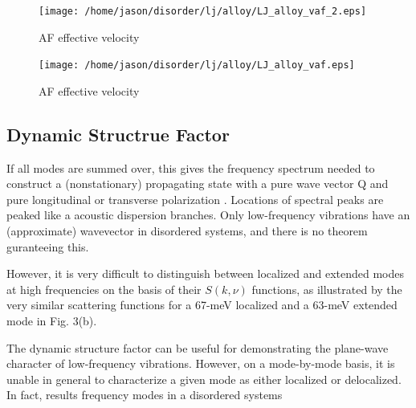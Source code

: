 \documentclass[aps,prb,preprint,superscriptaddress,amsmath,amssymb,floatfix]{revtex4}
\begin{document}
\begin{figure}
\begin{center}
\texttt{[image: /home/jason/disorder/lj/alloy/LJ\_alloy\_vaf\_2.eps]}
\vspace*{-5mm}
\end{center}
\caption{\label{FIG:phonon_diff} AF effective velocity}
\end{figure}

\begin{figure}
\begin{center}
\texttt{[image: /home/jason/disorder/lj/alloy/LJ\_alloy\_vaf.eps]}
\vspace*{-5mm}
\end{center}
\caption{\label{FIG:phonon_diff} AF effective velocity}
\end{figure}

\vspace*{100mm}

\subsection{\label{S:Lifetimes:}Dynamic Structrue Factor}
If all modes are summed over, this gives the frequency spectrum
needed to construct a (nonstationary) propagating state with a
pure wave vector Q and pure longitudinal or transverse polarization
 \cite{feldman_thermal_1993}. Locations of spectral peaks are peaked 
like a acoustic dispersion branches. Only low-frequency vibrations 
have an (approximate) wavevector in disordered systems, and there is 
no theorem guranteeing this. \cite{feldman_numerical_1999}

However, it is very
difficult to distinguish between localized and extended
modes at high frequencies on the basis of their $S(k,\nu)$
functions, as illustrated by the very similar scattering
functions for a 67-meV localized and a 63-meV extended
mode in Fig. 3(b). \cite{biswas_vibrational_1988}

The dynamic structure factor can be useful for demonstrating the 
plane-wave character of low-frequency vibrations.  However, on a 
mode-by-mode basis, it is unable in general to characterize a given mode 
as either localized or delocalized.  In fact, results   
frequency modes in a disordered systems
\end{document}
